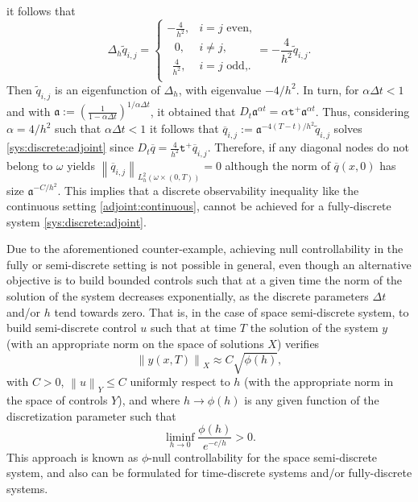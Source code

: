\documentclass[11pt,oneside,leqno]{amsart}
\numberwithin{equation}{section}
\numberwithin{equation}{section}
\newcommand{\trp}{\mathtt t^+}
\begin{document}
it follows that 
\begin{equation}
    \Delta_{h}\tilde{q}_{i,j}=\begin{cases}
    -\frac{4}{h^{2}},& i=j \text{ even,}\\
    \ \ \  0,& i\ne j, \\
    \ \ \frac{4}{h^{2}},& i=j\text{ odd,}.\\
    \end{cases}=-\frac{4}{h^{2}}\tilde{q}_{i,j}.
\end{equation}
Then $\tilde{q}_{i,j}$ is an eigenfunction of $\Delta_{h}$, with eigenvalue $-4/h^{2}$. In turn, for $\alpha \Delta t<1$ and with 
$\displaystyle \mathfrak{a}:=\left( \frac{1}{1-\alpha\Delta t}\right)^{1/\alpha\Delta t}$,  it obtained that $D_{t}\mathfrak{a}^{\alpha t}=\alpha\trp \mathfrak{a}^{\alpha t}$. Thus, 
considering $\alpha=4/h^{2}$ such that $\alpha \Delta t<1$ it follows that $\overline{q}_{i,j}:=\mathfrak{a}^{-4(T-t)/h^{2}}\tilde{q}_{i,j}$ solves \eqref{sys:discrete:adjoint} since $D_{t}\overline{q}=\frac{4}{h^{2}}\trp\overline{q}_{i,j}$. Therefore, if any diagonal nodes do not belong to $\omega$ yields $\left\| \overline{q}_{i,j}\right\|_{L^{2}_{h}(\omega\times (0,T))}=0$ although the norm of $\overline{q}(x,0)$ has size $\mathfrak{a}^{-C/h^{2}}$. This implies that a discrete observability inequality like the continuous setting \eqref{adjoint:continuous}, cannot be achieved for a fully-discrete system \eqref{sys:discrete:adjoint}.
\par Due to the aforementioned counter-example, achieving null controllability in the fully or semi-discrete setting is not possible in general, even though an alternative objective is to build bounded controls such that at a given time the norm of the solution of the system decreases exponentially, as the discrete parameters $\Delta t$ and/or $h$ tend towards zero. That is, in the case of space semi-discrete system, to build semi-discrete control $u$ such that at time $T$ the solution of the system $y$ (with an appropriate norm on the space of solutions $X$) verifies
\begin{equation}
    \left\| y(x,T)\right\|_{X} \approx C\sqrt{\phi(h)},
\end{equation}
with $C>0$, $\left\| u\right\|_{Y}\leq C$ uniformly respect to $h$ (with the appropriate norm in the space of controls $Y$), and
where $h\longrightarrow \phi(h)$ is any given function of the discretization parameter such that
\begin{equation}\label{eq:phi}
    \liminf_{h\rightarrow 0}\frac{\phi(h)}{e^{-c/h}}>0.
\end{equation}
This approach is known as $\phi$-null controllability for the space semi-discrete system, and also can be formulated for time-discrete systems and/or fully-discrete systems.
 
\end{document}
